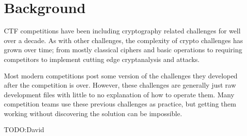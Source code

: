 \section{Background}
\label{sec:background}
CTF competitions have been including cryptography related challenges
for well over a decade. As with other challenges, the complexity of
crypto challenges has grown over time; from mostly classical ciphers
and basic operations to requiring competitors to implement cutting
edge cryptanalysis and attacks.

Most modern competitions post some version of the challenges they
developed after the competition is over. However, these challenges are
generally just raw development files with little to no explanation of
how to operate them. Many competition teams use these previous
challenges as practice, but getting them working without discovering
the solution can be impossible.

TODO:David
